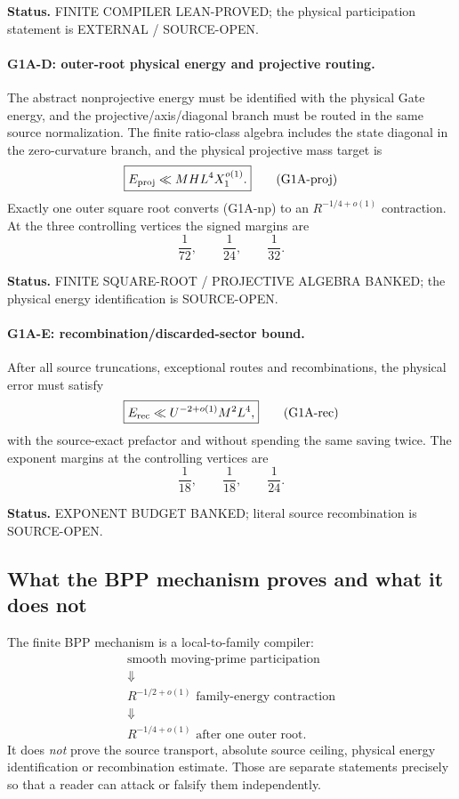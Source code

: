 \documentclass[11pt]{article}
\theoremstyle{definition}
\newcommand{\1}{\mathbf 1}
\newcommand{\status}[1]{\textsf{#1}}
\begin{document}
\noindent\textbf{Status.}
\status{FINITE COMPILER LEAN-PROVED}; the physical participation statement is
\status{EXTERNAL / SOURCE-OPEN}.

\paragraph{G1A-D: outer-root physical energy and projective routing.}
The abstract nonprojective energy must be identified with the physical Gate energy, and
the projective/axis/diagonal branch must be routed in the same source normalization.
The finite ratio-class algebra includes the state diagonal in the zero-curvature branch,
and the physical projective mass target is
\[
\boxed{
E_{\rm proj}
\ll
MHL^4X_1^{o(1)}.
}
\tag{G1A-proj}
\]
Exactly one outer square root converts (G1A-np) to an $R^{-1/4+o(1)}$ contraction.
At the three controlling vertices the signed margins are
\[
\boxed{\frac1{72},\qquad\frac1{24},\qquad\frac1{32}.}
\tag{G1A-margins}
\]

\noindent\textbf{Status.}
\status{FINITE SQUARE-ROOT / PROJECTIVE ALGEBRA BANKED}; the physical energy
identification is \status{SOURCE-OPEN}.

\paragraph{G1A-E: recombination/discarded-sector bound.}
After all source truncations, exceptional routes and recombinations, the physical error must
satisfy
\[
\boxed{
E_{\rm rec}
\ll
U^{-2+o(1)}M^2L^4,
}
\tag{G1A-rec}
\]
with the source-exact prefactor and without spending the same saving twice.  The exponent
margins at the controlling vertices are
\[
\boxed{\frac1{18},\qquad\frac1{18},\qquad\frac1{24}.}
\]

\noindent\textbf{Status.}
\status{EXPONENT BUDGET BANKED}; literal source recombination is \status{SOURCE-OPEN}.

\subsection{What the BPP mechanism proves and what it does not}

The finite BPP mechanism is a local-to-family compiler:
\[
\begin{gathered}
\text{smooth moving-prime participation}\\
\Downarrow\\
R^{-1/2+o(1)}\text{ family-energy contraction}\\
\Downarrow\\
R^{-1/4+o(1)}\text{ after one outer root}.
\end{gathered}
\]
It does \emph{not} prove the source transport, absolute source ceiling, physical energy
identification or recombination estimate.  Those are separate statements precisely so that
a reader can attack or falsify them independently.
\end{document}
